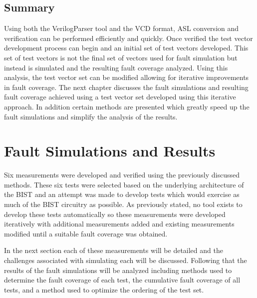 \documentclass[12pt]{report}
\begin{document}
\section{Summary}
Using both the VerilogParser tool and the VCD format, ASL conversion and verification can be performed efficiently and quickly.  Once verified the test vector development process can begin and an initial set of test vectors developed.  This set of test vectors is not the final set of vectors used for fault simulation but instead is simulated and the resulting fault coverage analyzed.  Using this analysis, the test vector set can be modified allowing for iterative improvements in fault coverage.  The next chapter discusses the fault simulations and resulting fault coverage achieved using a test vector set developed using this iterative approach.   In addition certain methods are presented which greatly speed up the fault simulations and simplify the analysis of the results.

\chapter{Fault Simulations and Results}
Six measurements were developed and verified using the previously discussed methods.  These six tests were selected based on the underlying architecture of the BIST and an attempt was made to develop tests which would exercise as much of the BIST circuitry as possible.  As previously stated, no tool exists to develop these tests automatically so these measurements were developed iteratively with additional measurements added and existing measurements modified until a suitable fault coverage was obtained.

In the next section each of these measurements will be detailed and the challenges associated with simulating each will be discussed.  Following that the results of the fault simulations will be analyzed including methods used to determine the fault coverage of each test, the cumulative fault coverage of all tests, and a method used to optimize the ordering of the test set.
\end{document}
